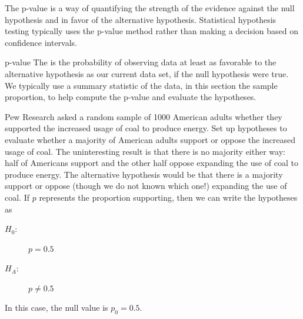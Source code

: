 \label{pValue}


The p-value is a way of quantifying the strength of the
evidence against the null hypothesis and in favor of the
alternative hypothesis.
Statistical hypothesis testing typically uses the
p-value method rather than making a decision based
on  confidence intervals.

\begin{onebox}{p-value}
  The 
  is the probability of observing data at least as favorable
  to the alternative hypothesis as our current data set,
  if the null hypothesis were true. We typically use a summary
  statistic of the data, in this section the sample proportion,
  to help compute the p-value and evaluate the hypotheses.
\end{onebox}



\newcommand{\pewcoalpollsize}{1000}
\newcommand{\pewcoalpollprop}{0.37}
\newcommand{\pewcoalpollpropcomplement}{0.63}
\newcommand{\pewcoalpollpercent}{37\%}
\newcommand{\pewcoalpollpercentcomplement}{63\%}
\newcommand{\pewcoalpollcount}{370}
\newcommand{\pewcoalpollcountcomplement}{630}
\newcommand{\pewcoalpollse}{0.0153}
\newcommand{\pewcoalpollnullvalue}{0.5}
\newcommand{\pewcoalpollnullse}{0.016}

\begin{examplewrap}
\begin{nexample}{Pew Research asked a random sample of
    \pewcoalpollsize{} American
    adults whether they supported the increased usage of coal to
    produce energy.
    Set up hypotheses to evaluate whether
    a majority of American adults support or oppose
    the increased usage of coal.}
  The uninteresting result is that there is no majority either way:
  half of Americans support and the other half oppose expanding the
  use of coal to produce energy. The alternative hypothesis would
  be that there is a majority support or oppose
  (though we do not known which one!) expanding the
  use of coal. If $p$ represents the proportion supporting, then
  we can write the hypotheses as
  \begin{description}
    \item[$H_0$:] $p = 0.5$
    \item[$H_A$:] $p \neq 0.5$
  \end{description}
  In this case, the null value is $p_0 = 0.5$.
\end{nexample}
\end{examplewrap}

